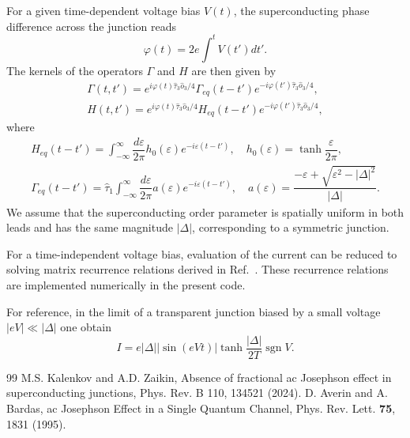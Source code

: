 \documentclass[aps,prb,amsmath,amssymb]{revtex4}
\DeclareMathOperator{\sgn}{sgn}
\begin{document}
For a given time-dependent voltage bias $V(t)$, the superconducting phase difference across the junction reads
\begin{equation}
\varphi (t)= 2e\int^tV(t')dt'.
\label{phi}
\end{equation}
The kernels of the operators $\Gamma$ and $H$ are then given by
\begin{gather}
\Gamma(t,t') = e^{i\varphi(t) \hat \tau_3 \hat o_3/4} \Gamma_{eq}(t-t') e^{-i\varphi(t') \hat \tau_3 \hat o_3/4},
\\
H(t,t') = e^{i\varphi(t) \hat \tau_3 \hat o_3/4} H_{eq}(t-t') e^{-i\varphi(t') \hat \tau_3 \hat o_3/4},
\end{gather}
where 
\begin{gather}
H_{eq}(t-t')
=
\int_{-\infty}^{\infty}\dfrac{d \varepsilon}{2\pi}
h_0(\varepsilon) e^{-i\varepsilon(t - t')},
\quad h_0(\varepsilon) = \tanh\dfrac{\varepsilon}{2\pi},
\\
\Gamma_{eq}(t-t')
=
\hat \tau_1
\int_{-\infty}^{\infty}\dfrac{d \varepsilon}{2\pi}
a(\varepsilon) e^{-i\varepsilon(t - t')},
\quad a(\varepsilon) = \dfrac{-\varepsilon + \sqrt{\varepsilon^2 - |\Delta|^2}}{|\Delta|}.
\end{gather}
We assume that the superconducting order parameter is spatially uniform in both leads and has the same magnitude $|\Delta|$, corresponding to a symmetric junction.

For a time-independent voltage bias, evaluation of the current can be reduced to solving matrix recurrence relations derived in Ref.~. These recurrence relations are implemented numerically in the present code.

For reference, in the limit of a transparent junction biased by a small voltage $|eV| \ll |\Delta|$ one obtain \cite{AB1} 
\begin{equation}
I = e |\Delta|  |\sin(eVt)| \tanh \dfrac{|\Delta|}{2T} \sgn V.
\end{equation}




\begin{thebibliography}{99}
 M.S. Kalenkov and A.D. Zaikin, Absence of fractional ac Josephson effect in superconducting junctions,
Phys. Rev. B 110, 134521 (2024).
 D. Averin and A. Bardas, ac Josephson Effect in a Single Quantum Channel, Phys. Rev. Lett. \textbf{75}, 1831 (1995).
\end{thebibliography}
\end{document}
